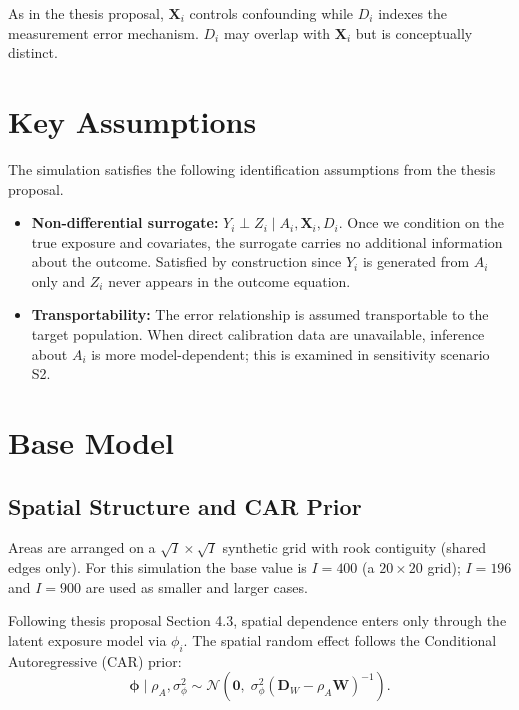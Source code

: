 \documentclass[11pt]{article}
\begin{document}
As in the thesis proposal, $\mathbf{X}_i$ controls confounding while $D_i$ indexes the
measurement error mechanism. $D_i$ may overlap with $\mathbf{X}_i$ but is conceptually
distinct.

\section{Key Assumptions}

The simulation satisfies the following identification assumptions from the thesis proposal.

\begin{itemize}
\item \textbf{Non-differential surrogate:} $Y_i \perp Z_i \mid A_i, \mathbf{X}_i, D_i$.
Once we condition on the true exposure and covariates, the surrogate carries no additional
information about the outcome. Satisfied by construction since $Y_i$ is generated from
$A_i$ only and $Z_i$ never appears in the outcome equation.

\item \textbf{Transportability:} The error relationship is assumed transportable to the
target population. When direct calibration data are unavailable, inference about $A_i$ is
more model-dependent; this is examined in sensitivity scenario S2.
\end{itemize}

\section{Base Model}
\label{sec:base}

\subsection{Spatial Structure and CAR Prior}

Areas are arranged on a $\sqrt{I} \times \sqrt{I}$ synthetic grid with rook contiguity
(shared edges only). For this simulation the base value is $I = 400$ (a $20 \times 20$ grid); $I = 196$ and $I = 900$ are used as smaller and larger cases.

Following thesis proposal Section 4.3, spatial dependence enters only through the
latent exposure model via $\phi_i$. The spatial random effect follows the Conditional
Autoregressive (CAR) prior:
\begin{equation}
\boldsymbol{\phi} \mid \rho_A, \sigma_\phi^2 \sim \mathcal{N}\!\left(\mathbf{0},\;
\sigma_\phi^2(\mathbf{D}_W - \rho_A\mathbf{W})^{-1}\right). \label{eq:car}
\end{equation}
\end{document}
